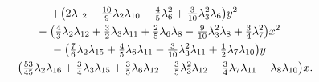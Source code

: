 \documentclass[pdftex]{sigma}
\numberwithin{equation}{section}
\begin{document}
\begin{gather}
 + \big(2\lambda_{12} - \tfrac{10}{9}\lambda_2 \lambda_{10} -\tfrac{4}{5}\lambda_6^2
 + \tfrac{3}{10}\lambda_3^2 \lambda_6 \big) y^2\nonumber\\
 \hphantom{\rho_{11} =}{} - \big(\tfrac{4}{3} \lambda_2 \lambda_{12}
 + \tfrac{3}{2}\lambda_3 \lambda_{11} + \tfrac{2}{5} \lambda_6 \lambda_8 - \tfrac{9}{10}\lambda_3^2 \lambda_8
 + \tfrac{3}{4}\lambda_7^2 \big) x^2 \nonumber\\
\hphantom{\rho_{11} =}{} - \big(\tfrac{7}{6}\lambda_2 \lambda_{15} + \tfrac{4}{5} \lambda_6 \lambda_{11} - \tfrac{3}{10} \lambda_3^2 \lambda_{11}
 + \tfrac{1}{2}\lambda_7 \lambda_{10}\big)y \nonumber\\
\hphantom{\rho_{11} =}{} - \big(\tfrac{53}{45}\lambda_2 \lambda_{16} + \tfrac{3}{4}\lambda_3 \lambda_{15} + \tfrac{3}{5}\lambda_6 \lambda_{12}
 - \tfrac{3}{5}\lambda_3^2 \lambda_{12} + \tfrac{3}{4}\lambda_7 \lambda_{11} - \lambda_8 \lambda_{10}\big) x.\nonumber
\end{gather}
\end{document}
